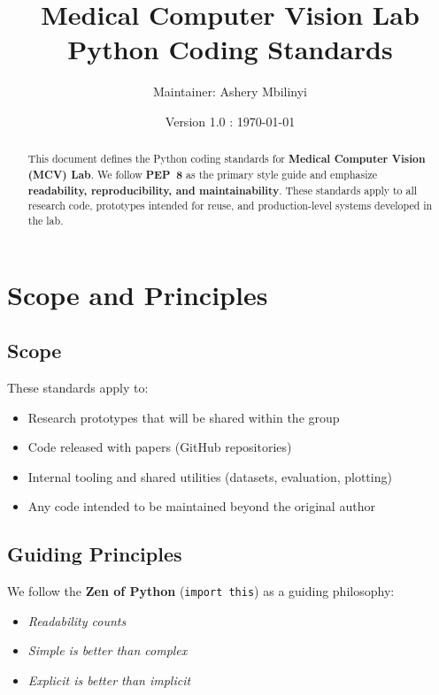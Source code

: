 \documentclass[11pt]{article}
\title{\textbf{Medical Computer Vision Lab \\ \normalsize{Python Coding Standards}}}
\author{Maintainer: Ashery Mbilinyi}
\date{Version 1.0 : \today}
\begin{document}
\maketitle

\tableofcontents
\newpage

\begin{abstract}
This document defines the Python coding standards for \textbf{Medical Computer Vision (MCV) Lab}. We follow \textbf{PEP~8} as the primary style guide and emphasize \textbf{readability, reproducibility, and maintainability}. These standards apply to all research code, prototypes intended for reuse, and production-level systems developed in the lab.
\end{abstract}
\newpage

\section{Scope and Principles}

\subsection{Scope}
These standards apply to:

\begin{itemize}[label={-},leftmargin=2em,labelsep=0.6em,itemsep=0.2em]
  \item Research prototypes that will be shared within the group
  \item Code released with papers (GitHub repositories)
  \item Internal tooling and shared utilities (datasets, evaluation, plotting)
  \item Any code intended to be maintained beyond the original author
\end{itemize}

\subsection{Guiding Principles}
We follow the \textbf{Zen of Python} (\texttt{import this}) as a guiding philosophy:
\begin{itemize}[label={-},leftmargin=2em,labelsep=0.6em,itemsep=0.2em]
  \item \emph{Readability counts}
  \item \emph{Simple is better than complex}
  \item \emph{Explicit is better than implicit}
\end{itemize}
\end{document}
